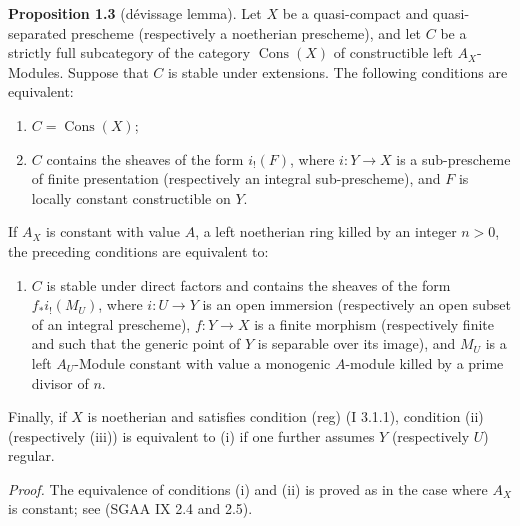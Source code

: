 \documentclass[11pt]{article}
\providecommand{\Cons}{\operatorname{Cons}}
\begin{document}
\textbf{Proposition 1.3} (dévissage lemma). Let $X$ be a quasi-compact and quasi-separated prescheme (respectively a noetherian prescheme), and let $C$ be a strictly full subcategory of the category $\Cons(X)$ of constructible left $A_X$-Modules. Suppose that $C$ is stable under extensions. The following conditions are equivalent:
\begin{enumerate}[label=(\roman*)]
\item $C=\Cons(X)$;
\item $C$ contains the sheaves of the form $i_!(F)$, where $i:Y\to X$ is a sub-prescheme of finite presentation (respectively an integral sub-prescheme), and $F$ is locally constant constructible on $Y$.
\end{enumerate}
If $A_X$ is constant with value $A$, a left noetherian ring killed by an integer $n>0$, the preceding conditions are equivalent to:
\begin{enumerate}[label=(\roman*),start=3]
\item $C$ is stable under direct factors and contains the sheaves of the form $f_*i_!(M_U)$, where $i:U\to Y$ is an open immersion (respectively an open subset of an integral prescheme), $f:Y\to X$ is a finite morphism (respectively finite and such that the generic point of $Y$ is separable over its image), and $M_U$ is a left $A_U$-Module constant with value a monogenic $A$-module killed by a prime divisor of $n$.
\end{enumerate}
Finally, if $X$ is noetherian and satisfies condition (reg) (I 3.1.1), condition (ii) (respectively (iii)) is equivalent to (i) if one further assumes $Y$ (respectively $U$) regular.

\emph{Proof.} The equivalence of conditions (i) and (ii) is proved as in the case where $A_X$ is constant; see (SGAA IX 2.4 and 2.5).
\end{document}
